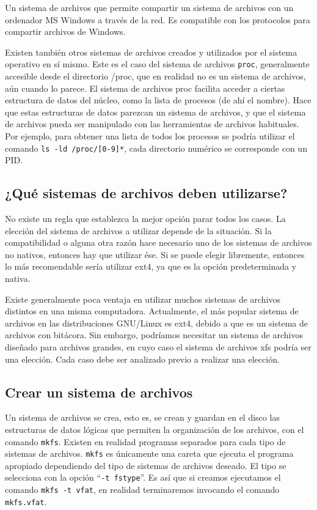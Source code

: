 \documentclass[12pt]{article}
\begin{document}
    Un sistema de archivos que permite compartir un sistema de archivos con
un ordenador MS Windows a través de la red. Es compatible con los 
protocolos para compartir archivos de Windows. 


Existen también otros sistemas de archivos creados y utilizados por el 
sistema operativo en sí mismo. Este es el caso del sistema de archivos 
\texttt{proc}, generalmente accesible desde el directorio /proc, que en 
realidad no es un sistema de archivos, aún cuando lo parece. El sistema 
de archivos proc 
facilita acceder a ciertas estructura de datos del núcleo, como la lista 
de procesos (de ahí el nombre). Hace que estas estructuras de datos 
parezcan un sistema de archivos, y que el sistema de archivos pueda ser 
manipulado con las herramientas de archivos habituales. Por ejemplo, para
obtener una lista de todos los procesos se podría utilizar el comando 
\texttt{ls -ld /proc/[0-9]*}, cada directorio numérico se corresponde con
un PID. 


\subsection*{¿Qué sistemas de archivos deben utilizarse?}

No existe un regla que establezca la mejor opción parar todos los casos. 
La elección del sistema de archivos a utilizar depende de la situación. Si 
la compatibilidad o alguna otra razón hace necesario uno de los sistemas 
de archivos no nativos, entonces hay que utilizar ése. Si se puede elegir 
libremente, entonces lo más recomendable sería utilizar ext4, ya que es 
la opción predeterminada y nativa. 

Existe generalmente poca ventaja en utilizar muchos sistemas de archivos 
distintos en una misma computadora. Actualmente, el más popular 
sistema de archivos en las distribuciones GNU/Linux es ext4, debido a que 
es un sistema de archivos con bitácora. Sin embargo, podríamos necesitar 
un sistema de archivos diseñado para archivos grandes, en cuyo caso 
el sistema de archivos xfs podría ser una elección. Cada caso debe ser
analizado previo a realizar una elección.

\subsection*{Crear un sistema de archivos}

Un sistema de archivos se crea, esto es, se crean y guardan en el disco las
estructuras de datos lógicas que permiten la organización de los archivos,
con el comando \texttt{mkfs}. Existen en realidad programas separados para 
cada tipo de sistemas de archivos. \texttt{mkfs} es únicamente una careta 
que ejecuta el programa apropiado dependiendo del tipo de sistemas de 
archivos deseado. El tipo se selecciona 
con la opción ``\texttt{-t fstype}''. Es así que si creamos ejecutamos 
el comando \texttt{mkfs -t vfat}, en realidad terminaremos invocando 
el comando \texttt{mkfs.vfat}.
\end{document}
